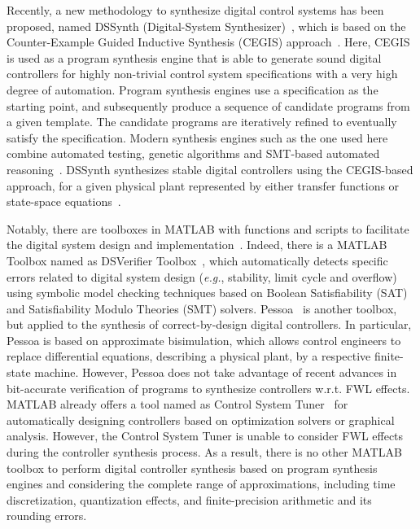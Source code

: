 \documentclass[10pt,conference]{IEEEtran}
\begin{document}
Recently, a new methodology to synthesize digital control systems has been proposed, 
named DSSynth (Digital-System Synthesizer)~\cite{abate2017, abatecav2017}, 
which is based on the Counter-Example Guided Inductive Synthesis 
(CEGIS) approach~\cite{DBLP:conf/asplos/Solar-LezamaTBSS06}. Here, CEGIS is used
as a program synthesis engine that is able to generate sound digital controllers for highly non-trivial 
control system specifications with a very high degree of automation. Program synthesis engines 
use a specification as the starting point, and subsequently produce a sequence of candidate 
programs from a given template. The candidate programs are iteratively refined to eventually 
satisfy the specification. Modern synthesis engines such as the one used here combine automated testing, genetic algorithms 
and SMT-based automated reasoning~\cite{DBLP:journals/corr/AlurFSS16a, DBLP:conf/lpar/DavidKL15}. 
DSSynth synthesizes stable digital controllers using the CEGIS-based approach,
for a given physical plant represented by either transfer functions or state-space equations~\cite{abate2017,abatecav2017}.

Notably, there are toolboxes in MATLAB with functions and scripts to facilitate the 
digital system design and implementation~\cite{matlab-toolbox}. Indeed, there is a MATLAB 
Toolbox named as DSVerifier Toolbox~\cite{issta2017}, which automatically detects 
specific errors related to digital system design ({\it e.g.}, stability, limit cycle and overflow) 
using symbolic model checking techniques based on Boolean Satisfiability (SAT) and 
Satisfiability Modulo Theories (SMT) solvers. Pessoa~\cite{mazo2010pessoa} is another 
toolbox, but applied to the synthesis of correct-by-design digital controllers. 
In particular, Pessoa is based on approximate bisimulation, which allows control engineers to replace differential equations, 
describing a physical plant, by a respective finite-state machine. However, Pessoa does not take advantage of
recent advances in bit-accurate verification of programs to synthesize controllers w.r.t. FWL effects. MATLAB already offers a tool 
named as Control System Tuner~\cite{autotuner} for automatically designing controllers based on optimization solvers or graphical analysis. 
However, the Control System Tuner is unable to consider FWL effects during the controller synthesis process.
As a result, there is no other MATLAB toolbox to perform digital controller synthesis based on 
program synthesis engines and considering the complete range of approximations, including time discretization, 
quantization effects, and finite-precision arithmetic and its rounding errors. 
\end{document}

